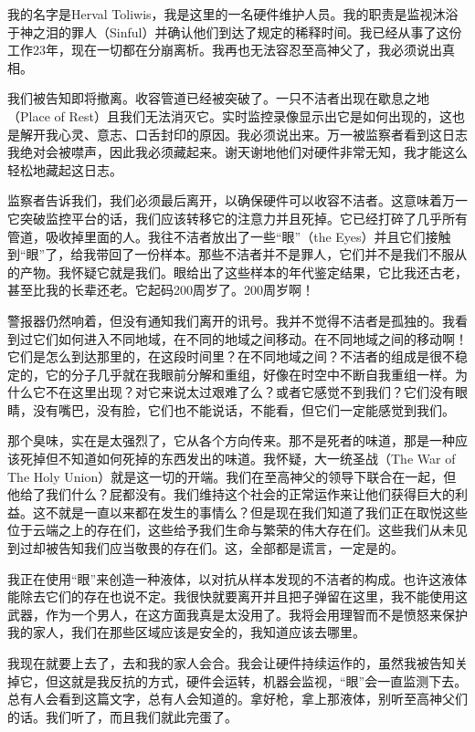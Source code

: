 \begin{scpbox}

我的名字是Herval Toliwis，我是这里的一名硬件维护人员。我的职责是监视沐浴于神之泪的罪人（Sinful）并确认他们到达了规定的稀释时间。我已经从事了这份工作23年，现在一切都在分崩离析。我再也无法容忍至高神父了，我必须说出真相。

我们被告知即将撤离。收容管道已经被突破了。一只不洁者出现在歇息之地（Place of Rest）且我们无法消灭它。实时监控录像显示出它是如何出现的，这也是解开我心灵、意志、口舌封印的原因。我必须说出来。万一被监察者看到这日志我绝对会被噤声，因此我必须藏起来。谢天谢地他们对硬件非常无知，我才能这么轻松地藏起这日志。

监察者告诉我们，我们必须最后离开，以确保硬件可以收容不洁者。这意味着万一它突破监控平台的话，我们应该转移它的注意力并且死掉。它已经打碎了几乎所有管道，吸收掉里面的人。我往不洁者放出了一些“眼”（the Eyes）并且它们接触到“眼”了，给我带回了一份样本。那些不洁者并不是罪人，它们并不是我们不服从的产物。我怀疑它就是我们。眼给出了这些样本的年代鉴定结果，它比我还古老，甚至比我的长辈还老。它起码200周岁了。200周岁啊！

警报器仍然响着，但没有通知我们离开的讯号。我并不觉得不洁者是孤独的。我看到过它们如何进入不同地域，在不同的地域之间移动。在不同地域之间的移动啊！它们是怎么到达那里的，在这段时间里？在不同地域之间？不洁者的组成是很不稳定的，它的分子几乎就在我眼前分解和重组，好像在时空中不断自我重组一样。为什么它不在这里出现？对它来说太过艰难了么？或者它感觉不到我们？它们没有眼睛，没有嘴巴，没有脸，它们也不能说话，不能看，但它们一定能感觉到我们。

那个臭味，实在是太强烈了，它从各个方向传来。那不是死者的味道，那是一种应该死掉但不知道如何死掉的东西发出的味道。我怀疑，大一统圣战（The War of The Holy Union）就是这一切的开端。我们在至高神父的领导下联合在一起，但他给了我们什么？屁都没有。我们维持这个社会的正常运作来让他们获得巨大的利益。这不就是一直以来都在发生的事情么？但是现在我们知道了我们正在取悦这些位于云端之上的存在们，这些给予我们生命与繁荣的伟大存在们。这些我们从未见到过却被告知我们应当敬畏的存在们。这，全部都是谎言，一定是的。

我正在使用“眼”来创造一种液体，以对抗从样本发现的不洁者的构成。也许这液体能除去它们的存在也说不定。我很快就要离开并且把子弹留在这里，我不能使用这武器，作为一个男人，在这方面我真是太没用了。我将会用理智而不是愤怒来保护我的家人，我们在那些区域应该是安全的，我知道应该去哪里。

我现在就要上去了，去和我的家人会合。我会让硬件持续运作的，虽然我被告知关掉它，但这就是我反抗的方式，硬件会运转，机器会监视，“眼”会一直监测下去。总有人会看到这篇文字，总有人会知道的。拿好枪，拿上那液体，别听至高神父们的话。我们听了，而且我们就此完蛋了。

\end{scpbox}

